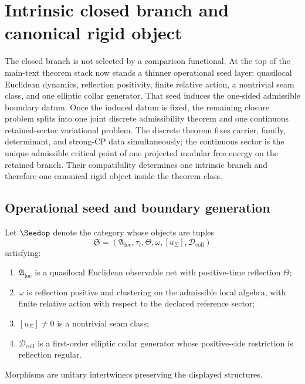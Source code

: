 \section{Intrinsic closed branch and canonical rigid object}
\label{sec:rg-map-compiler-outputs}

The closed branch is not selected by a comparison functional. At the top of the main-text theorem
stack now stands a thinner operational seed layer: quasilocal Euclidean dynamics, reflection
positivity, finite relative action, a nontrivial seam class, and one elliptic collar generator.
That seed induces the one-sided admissible boundary datum. Once the induced datum is fixed, the
remaining closure problem splits into one joint discrete admissibility theorem and one continuous
retained-sector variational problem. The discrete theorem fixes carrier, family, determinant, and
strong-CP data simultaneously; the continuous sector is the unique admissible critical point of one
projected modular free energy on the retained branch. Their compatibility determines one intrinsic
branch and therefore one canonical rigid object inside the theorem class.

\subsection{Operational seed and boundary generation}
\label{sec:operational-seed-generation}

\begin{definition}
\label{def:operational-seed-category}
Let $\Seedop$ denote the category whose objects are tuples
\[
\mathfrak S=(\mathfrak A_{\mathrm{loc}},\tau_t,\Theta,\omega,[u_\Sigma],\mathcal D_{\mathrm{coll}})
\]
satisfying:
\begin{enumerate}[label=(\roman*), leftmargin=1.5em, topsep=3pt, itemsep=2pt]
    \item $\mathfrak A_{\mathrm{loc}}$ is a quasilocal Euclidean observable net with positive-time
    reflection $\Theta$;
    \item $\omega$ is reflection positive and clustering on the admissible local algebra, with finite
    relative action with respect to the declared reference sector;
    \item $[u_\Sigma]\neq 0$ is a nontrivial seam class;
    \item $\mathcal D_{\mathrm{coll}}$ is a first-order elliptic collar generator whose positive-side
    restriction is reflection regular.
\end{enumerate}
Morphisms are unitary intertwiners preserving the displayed structures.
\end{definition}

